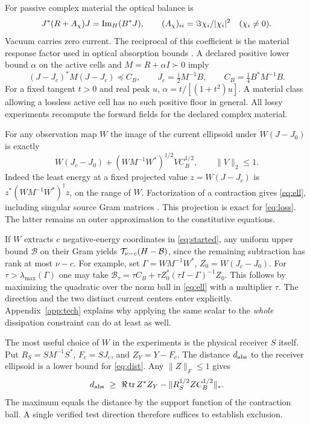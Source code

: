 For passive complex material the optical balance is
\[
 J^*(R+A_\chi)J=\operatorname{Im}_{H}(B^*J),\qquad
 (A_\chi)_{ii}=\Im\chi_i/|\chi_i|^2\quad(\chi_i\ne0).
\]
Vacuum carries zero current. The reciprocal of this coefficient is the material response factor used in optical absorption bounds \cite{miller}. A declared positive lower bound $\alpha$ on the active cells and $M=R+\alpha I\succ0$ imply
\begin{equation}
 (J-J_c)^*M(J-J_c)\preceq C_B,\qquad
 J_c=\tfrac{\mathrm i}{2}M^{-1}B,\qquad C_B=\tfrac14 B^*M^{-1}B .
 \label{eq:loss}
\end{equation}
For a fixed tangent $t>0$ and real peak $u$, $\alpha=t/[(1+t^2)u]$. A material class allowing a lossless active cell has no such positive floor in general. All lossy experiments recompute the forward fields for the declared complex material.

For any observation map $W$ the image of the current ellipsoid under $W(J-J_0)$ is exactly
\begin{equation}
 W(J_c-J_0)+(WM^{-1}W^*)^{1/2} V C_B^{1/2},\qquad \|V\|_2\le1.
 \label{eq:ell}
\end{equation}
Indeed the least energy at a fixed projected value $z=W(J-J_c)$ is $z^*(WM^{-1}W^*)^\dagger z$, on the range of $W$. Factorization of a contraction gives \eqref{eq:ell}, including singular source Gram matrices \cite{douglas}. This projection is exact for \eqref{eq:loss}. The latter remains an outer approximation to the constitutive equations.

If $W$ extracts $c$ negative-energy coordinates in \eqref{eq:started}, any uniform upper bound $\mathcal B$ on their Gram yields $\mathcal T_{\nu-c}(H-\mathcal B)$, since the remaining subtraction has rank at most $\nu-c$. For example, set $\Gamma=WM^{-1}W^*$, $Z_0=W(J_c-J_0)$. For $\tau>\lambda_{\max}(\Gamma)$ one may take
$\mathcal B_\tau=\tau C_B+\tau Z_0^*(\tau I-\Gamma)^{-1}Z_0$.
This follows by maximizing the quadratic over the norm ball in \eqref{eq:ell} with a multiplier $\tau$. The direction and the two distinct current centers enter explicitly. Appendix~\ref{app:tech} explains why applying the same scalar to the \emph{whole} dissipation constraint can do at least as well.

The most useful choice of $W$ in the experiments is the physical receiver $S$ itself. Put $R_S=SM^{-1}S^*$, $F_c=SJ_c$, and $Z_Y=Y-F_c$. The distance $d_{\rm abs}$ to the receiver ellipsoid is a lower bound for \eqref{eq:dist}. Any $\|Z\|_F\le1$ gives
\begin{equation}
 d_{\rm abs}\ \ge\ \Re\operatorname{tr} Z^*Z_Y-\|R_S^{1/2} Z C_B^{1/2}\|_* .
 \label{eq:support}
\end{equation}
The maximum equals the distance by the support function of the contraction ball. A single verified test direction therefore suffices to establish exclusion.

